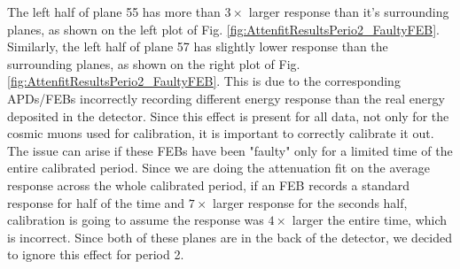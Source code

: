 The left half of plane 55 has more than $3\times$ larger response than it's surrounding planes, as shown on the left plot of Fig. \ref{fig:AttenfitResultsPerio2_FaultyFEB}. Similarly, the left half of plane 57 has slightly lower response than the surrounding planes, as shown on the right plot of Fig. \ref{fig:AttenfitResultsPerio2_FaultyFEB}. This is due to the corresponding APDs/FEBs incorrectly recording different energy response than the real energy deposited in the detector. Since this effect is present for all data, not only for the cosmic muons used for calibration, it is important to correctly calibrate it out. The issue can arise if these FEBs have been "faulty" only for a limited time of the entire calibrated period. Since we are doing the attenuation fit on the average response across the whole calibrated period, if an FEB records a standard response for half of the time and $7\times$ larger response for the seconds half, calibration is going to assume the response was $4\times$ larger the entire time, which is incorrect. Since both of these planes are in the back of the detector, we decided to ignore this effect for period 2.

